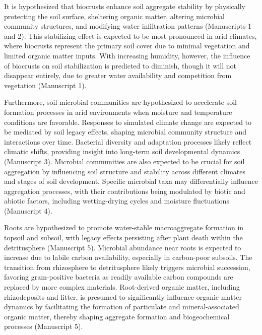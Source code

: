 It is hypothesized that biocrusts enhance soil aggregate stability by physically protecting the soil surface, sheltering organic matter, altering microbial community structures, and modifying water infiltration patterns (Manuscripts 1 and 2). This stabilizing effect is expected to be most pronounced in arid climates, where biocrusts represent the primary soil cover due to minimal vegetation and limited organic matter inputs. With increasing humidity, however, the influence of biocrusts on soil stabilization is predicted to diminish, though it will not disappear entirely, due to greater water availability and competition from vegetation (Manuscript 1).

Furthermore, soil microbial communities are hypothesized to accelerate soil formation processes in arid environments when moisture and temperature conditions are favorable. Responses to simulated climate change are expected to be mediated by soil legacy effects, shaping microbial community structure and interactions over time. Bacterial diversity and adaptation processes likely reflect climatic shifts, providing insight into long-term soil developmental dynamics (Manuscript 3). Microbial communities are also expected to be crucial for soil aggregation by influencing soil structure and stability across different climates and stages of soil development. Specific microbial taxa may differentially influence aggregation processes, with their contributions being modulated by biotic and abiotic factors, including wetting-drying cycles and moisture fluctuations (Manuscript 4).

Roots are hypothesized to promote water-stable macroaggregate formation in topsoil and subsoil, with legacy effects persisting after plant death within the detritusphere (Manuscript 5). Microbial abundance near roots is expected to increase due to labile carbon availability, especially in carbon-poor subsoils. The transition from rhizosphere to detritusphere likely triggers microbial succession, favoring gram-positive bacteria as readily available carbon compounds are replaced by more complex materials. Root-derived organic matter, including rhizodeposits and litter, is presumed to significantly influence organic matter dynamics by facilitating the formation of particulate and mineral-associated organic matter, thereby shaping aggregate formation and biogeochemical processes (Manuscript 5).

